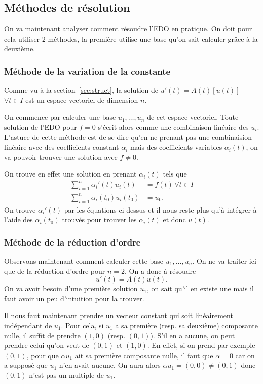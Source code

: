 \subsection{Méthodes de résolution}
On va maintenant analyser comment résoudre l'EDO en pratique.
On doit pour cela utiliser 2 méthodes,
la première utilise une base qu'on sait calculer grâce à la deuxième.

\subsubsection{Méthode de la variation de la constante}
Comme vu à la section~\ref{sec:struct},
la solution de $u'(t) = A(t)[u(t)]$ $\forall t \in I$ est un espace vectoriel
de dimension $n$.

On commence par calculer une base $u_1,\ldots,u_n$ de cet espace vectoriel.
Toute solution de l'EDO pour $f = 0$ s'écrit alors comme une combinaison
linéaire des $u_i$.
L'astuce de cette méthode est de se dire qu'en ne prenant pas une combinaision
linéaire avec des coefficients constant $\alpha_i$ mais des coefficients
variables $\alpha_i(t)$, on va pouvoir trouver une solution avec $f \neq 0$.

On trouve en effet une solution en prenant $\alpha_i(t)$ tels que
\begin{align*}
  \sum_{i=1}^n \alpha_i'(t)u_i(t) & = f(t) \,\forall t \in I\\
  \sum_{i=1}^n \alpha_i(t_0)u_i(t_0) & = u_0.
\end{align*}
On trouve $\alpha_i'(t)$ par les équations ci-dessus et il
nous reste plus qu'à intégrer à l'aide des $\alpha_i(t_0)$ trouvés
pour trouver les $\alpha_i(t)$
et donc $u(t)$.

\subsubsection{Méthode de la réduction d'ordre}
Observons maintenant comment calculer cette base $u_1,\ldots,u_n$.
On ne va traiter ici que de la réduction d'ordre pour $n=2$.
On a donc à résoudre
\[ u'(t) = A(t)u(t). \]
On va avoir besoin d'une première solution $u_1$,
on sait qu'il en existe une mais
il faut avoir un peu d'intuition pour la trouver.

Il nous faut maintenant prendre un vecteur constant
qui soit linéairement indépendant de $u_1$.
Pour cela, si $u_1$ a sa première (resp. sa deuxième) composante nulle,
il suffit de prendre $(1, 0)$ (resp. $(0, 1)$).
S'il en a aucune, on peut prendre celui qu'on veut de $(0,1)$ et $(1,0)$.
En effet, si on prend par exemple $(0,1)$,
pour que $\alpha u_1$ ait sa première composante nulle,
il faut que $\alpha = 0$ car on a supposé que $u_1$ n'en avait aucune.
On aura alors $\alpha u_1 = (0,0) \neq (0,1)$
donc $(0,1)$ n'est pas un multiple de $u_1$.

